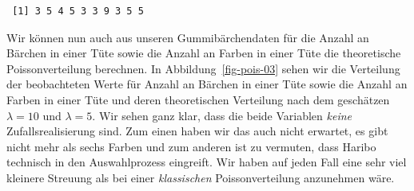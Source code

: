 \documentclass[
  letterpaper,
]{scrbook}
\begin{document}
\begin{verbatim}
 [1] 3 5 4 5 3 3 9 3 5 5
\end{verbatim}

{}

Wir können nun auch aus unseren Gummibärchendaten für die Anzahl an
Bärchen in einer Tüte sowie die Anzahl an Farben in einer Tüte die
theoretische Poissonverteilung berechnen. In Abbildung~\ref{fig-pois-03}
sehen wir die Verteilung der beobachteten Werte für Anzahl an Bärchen in
einer Tüte sowie die Anzahl an Farben in einer Tüte und deren
theoretischen Verteilung nach dem geschätzen \(\lambda = 10\) und
\(\lambda = 5\). Wir sehen ganz klar, dass die beide Variablen
\emph{keine} Zufallsrealisierung sind. Zum einen haben wir das auch
nicht erwartet, es gibt nicht mehr als sechs Farben und zum anderen ist
zu vermuten, dass Haribo technisch in den Auswahlprozess eingreift. Wir
haben auf jeden Fall eine sehr viel kleinere Streuung als bei einer
\emph{klassischen} Poissonverteilung anzunehmen wäre.
\end{document}
